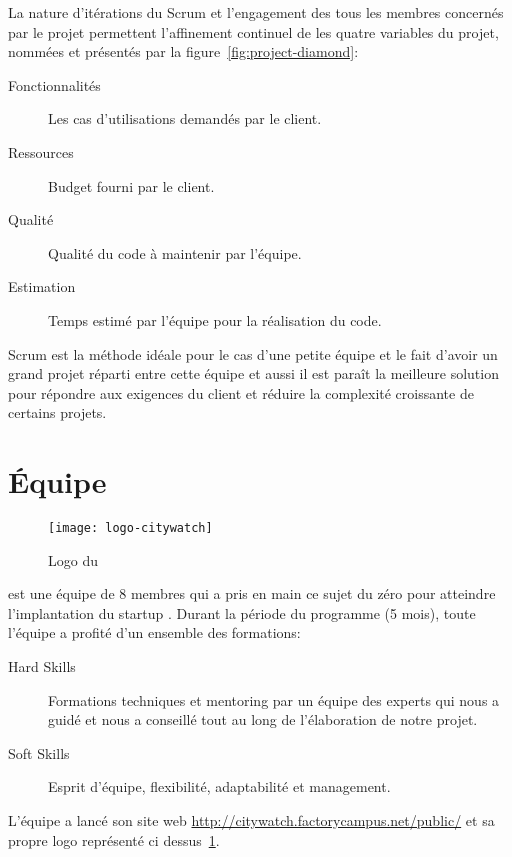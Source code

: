 La nature d'itérations du Scrum et l'engagement des tous les membres concernés
par le projet permettent l'affinement continuel de les quatre variables du
projet, nommées  et présentés par la
figure~\ref{fig:project-diamond}:

\begin{description}
    \item [Fonctionnalités] Les cas d'utilisations demandés par le client.
    \item [Ressources] Budget fourni par le client.
    \item [Qualité] Qualité du code à maintenir par l'équipe.
    \item [Estimation] Temps estimé par l'équipe pour la réalisation du code.
\end{description}



Scrum est la méthode idéale pour le cas d'une petite équipe et le fait d'avoir
un grand projet réparti entre cette équipe et aussi il est paraît la meilleure
solution pour répondre aux exigences du client et réduire la complexité
croissante de certains projets.


\section{Équipe }

\begin{figure}[h]
    \centering
    \texttt{[image: logo-citywatch]}
    \caption{Logo du }
    \label{fig:logo-citywatch}
\end{figure}


 est une équipe de 8 membres qui a pris en main ce sujet
du zéro pour atteindre l'implantation du startup .
Durant la période du programme (5 mois), toute l'équipe a profité d'un ensemble
des formations:

\begin{description}
 \item [Hard Skills] Formations techniques et mentoring par un équipe des
     experts qui nous a guidé et nous a conseillé tout au long de l'élaboration
     de notre projet.
 \item [Soft Skills] Esprit d'équipe, flexibilité, adaptabilité et management.
\end{description}

L'équipe a lancé son site web \url{http://citywatch.factorycampus.net/public/}
et sa propre logo représenté ci dessus~\ref{fig:logo-citywatch}.

